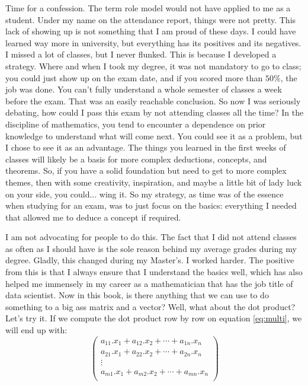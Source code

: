 \documentclass[600paper, 11pt,twoside,openany]{kdp}
\begin{document}
\indent Time for a confession. The term role model would not have applied to me as a student. Under my name on the attendance report, things were not pretty. This lack of showing up is not something that I am proud of these days. I could have learned way more in university, but everything has its positives and its negatives. I missed a lot of classes, but I never flunked. This is because I developed a strategy. Where and when I took my degree, it was not mandatory to go to class; you could just show up on the exam date, and if you scored more than $50\%$, the job was done. You can’t fully understand a whole semester of classes a week before the exam. That was an easily reachable conclusion. So now I was seriously debating, how could I pass this exam by not attending classes all the time? In the discipline of mathematics, you tend to encounter a dependence on prior knowledge to understand what will come next. You could see it as a problem, but I chose to see it as an advantage. The things you learned in the first weeks of classes will likely be a basis for more complex deductions, concepts, and theorems. So, if you have a solid foundation but need to get to more complex themes, then with some creativity, inspiration, and maybe a little bit of lady luck on your side, you could... wing it. So my strategy, as time was of the essence when studying for an exam, was to just focus on the basics: everything I needed that allowed me to deduce a concept if required.
\par 
\vspace{-3pt}
\indent I am not advocating for people to do this. The fact that I did not attend classes as often as I should have is the sole reason behind my average grades during my degree. Gladly, this changed during my Master’s. I worked harder. The positive from this is that I always ensure that I understand the basics well, which has also helped me immensely in my career as a mathematician that has the job title of data scientist. Now in this book, is there anything that we can use to do something to a big ass matrix and a vector? Well, what about the dot product? Let’s try it. If we compute the dot product row by row on equation \ref{eq:multi}, we will end up with:
\[\begin{pmatrix}
a_{11}.x_1 + a_{12}.x_2 + \cdots + a_{1n}.x_n\\
a_{21}.x_1 + a_{22}.x_2  + \cdots + a_{2n}.x_n\\
\vdots \\
a_{m1}.x_1 + a_{m2}.x_2  + \cdots + a_{mn}.x_n\\
\end{pmatrix} 
\]
\end{document}
